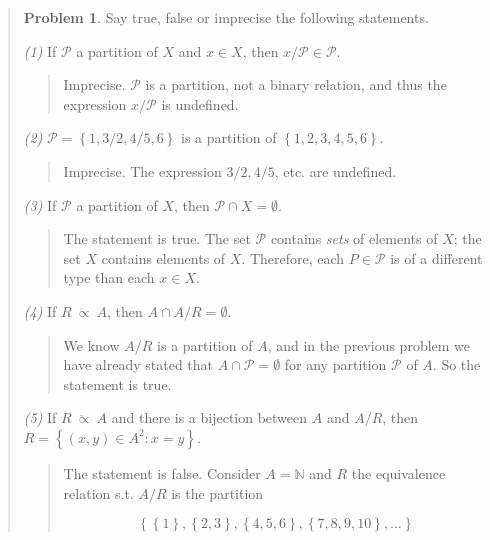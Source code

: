 \documentclass[a4paper, 12pt]{article}
\theoremstyle{definition}
\newtheorem{problem}{Problem}
\theoremstyle{definition}
\theoremstyle{definition}
\begin{document}
\small
\begin{quote}

\begin{problem}
    Say true, false or imprecise the following statements.
\end{problem}

\textit{(1)} If $\mathcal{P}$ a partition of $X$ and $x \in X$, then $x /
\mathcal{P} \in \mathcal{P}$.

\begin{quote}
    Imprecise. $\mathcal{P}$ is a partition, not a binary relation, and thus the
    expression $x / \mathcal{P}$ is undefined.
\end{quote}

\textit{(2)} $\mathcal{P} = \left\{ 1, 3 / 2, 4 / 5, 6 \right\} $ is a partition
of $\left\{ 1, 2, 3, 4, 5, 6 \right\} $.

\begin{quote}
    Imprecise. The expression $3 / 2, 4 / 5$, etc. are undefined.
\end{quote}

\textit{(3)} If $\mathcal{P}$ a partition of $X$, then $\mathcal{P} \cap X =
\emptyset$.

\begin{quote}
    The statement is true. The set $\mathcal{P}$ contains \textit{sets} of
    elements of $X$; the set $X$ contains elements of $X$. Therefore, each $P
    \in \mathcal{P}$ is of a different type than each $x \in X$.
\end{quote}

\textit{(4)} If $R ~ \ddot{\propto} ~ A$, then $A \cap A / R = \emptyset$.

\begin{quote}
    We know $A / R$ is a partition of $A$, and in the previous problem we have
    already stated that $A \cap \mathcal{P} = \emptyset$ for any partition
    $\mathcal{P}$ of $A$. So the statement is true.
\end{quote}

\textit{(5)} If $R ~ \ddot{\propto} ~ A$ and there is a bijection between $A$
and $A / R$, then $R = \left\{ (x, y ) \in A^2  : x = y \right\} $.

\begin{quote}
    The statement is false. Consider $A = \mathbb{N}$ and $R$ the equivalence
    relation s.t. $A / R$ is the partition 
    
    $$\left\{ \left\{ 1 \right\}, \left\{
    2, 3\right\}, \left\{ 4, 5, 6 \right\}, \left\{ 7, 8, 9, 10 \right\}, \ldots
\right\} $$


\end{quote}
\end{quote}
\end{document}
